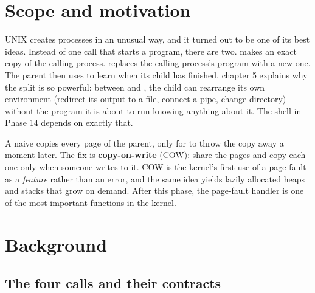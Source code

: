 \documentclass[11pt,a4paper]{article}
\begin{document}


\section{Scope and motivation}

UNIX creates processes in an unusual way, and it turned out to be one of its best ideas. Instead of one call that
starts a program, there are two.  makes an exact copy of the calling process.  replaces the
calling process's program with a new one. The parent then uses  to learn when its child has finished.
\OSTEP chapter 5 explains why the split is so powerful: between  and , the child can rearrange
its own environment (redirect its output to a file, connect a pipe, change directory) without the program it is about
to run knowing anything about it. The shell in Phase 14 depends on exactly that.

A naive  copies every page of the parent, only for  to throw the copy away a moment later. The
fix is \textbf{copy-on-write} (COW): share the pages and copy each one only when someone writes to it. COW is the kernel's
first use of a page fault as a \emph{feature} rather than an error, and the same idea yields lazily allocated heaps
and stacks that grow on demand. After this phase, the page-fault handler is one of the most important functions in
the kernel.

\section{Background}

\subsection{The four calls and their contracts}
\end{document}
